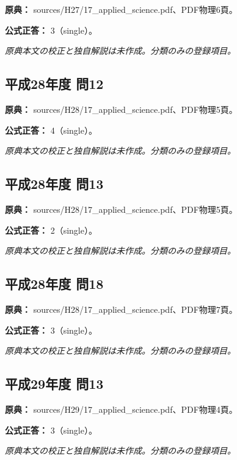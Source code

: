 \noindent\textbf{原典：} sources/H27/17\_applied\_science.pdf、PDF物理6頁。

\textbf{公式正答：} 3（single）。

\par\textit{原典本文の校正と独自解説は未作成。分類のみの登録項目。}

\subsection{平成28年度 問12}
\label{q:h28-reg-applied-12}

\noindent\textbf{原典：} sources/H28/17\_applied\_science.pdf、PDF物理5頁。

\textbf{公式正答：} 4（single）。

\par\textit{原典本文の校正と独自解説は未作成。分類のみの登録項目。}

\subsection{平成28年度 問13}
\label{q:h28-reg-applied-13}

\noindent\textbf{原典：} sources/H28/17\_applied\_science.pdf、PDF物理5頁。

\textbf{公式正答：} 2（single）。

\par\textit{原典本文の校正と独自解説は未作成。分類のみの登録項目。}

\subsection{平成28年度 問18}
\label{q:h28-reg-applied-18}

\noindent\textbf{原典：} sources/H28/17\_applied\_science.pdf、PDF物理7頁。

\textbf{公式正答：} 3（single）。

\par\textit{原典本文の校正と独自解説は未作成。分類のみの登録項目。}

\subsection{平成29年度 問13}
\label{q:h29-reg-applied-13}

\noindent\textbf{原典：} sources/H29/17\_applied\_science.pdf、PDF物理4頁。

\textbf{公式正答：} 3（single）。

\par\textit{原典本文の校正と独自解説は未作成。分類のみの登録項目。}

